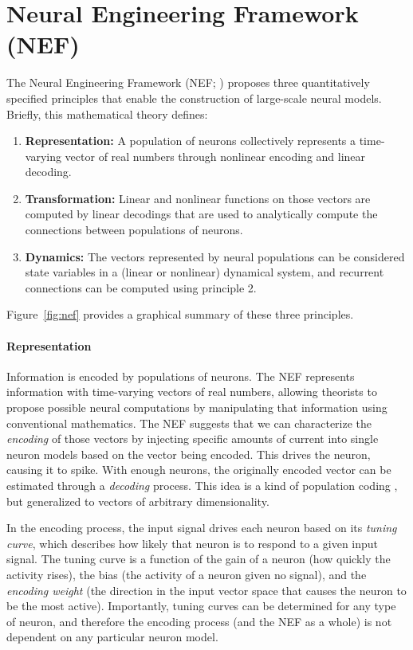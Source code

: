 \documentclass{frontiersSCNS}
\begin{document}
\section{Neural Engineering Framework (NEF)} \label{sec:nef}

The Neural Engineering Framework (NEF; \citealp{eliasmith2003})
proposes three quantitatively specified principles
that enable the construction
of large-scale neural models.
Briefly, this mathematical theory defines:
\begin{enumerate}
  \item \textbf{Representation:} A population of neurons
    collectively represents a time-varying vector of real numbers
    through nonlinear encoding and linear decoding.
  \item \textbf{Transformation:} Linear and nonlinear
    functions on those vectors
    are computed by linear decodings
    that are used to analytically compute
    the connections between populations of neurons.
  \item \textbf{Dynamics:} The vectors represented
    by neural populations can be considered state variables
    in a (linear or nonlinear) dynamical system,
    and recurrent connections can be computed
    using principle 2.
\end{enumerate}
Figure~\ref{fig:nef} provides a graphical
summary of these three principles.

\paragraph{Representation}
Information is encoded by populations of neurons.
The NEF represents information
with time-varying vectors of real numbers,
allowing theorists to propose possible
neural computations by
manipulating that information
using conventional mathematics.
The NEF suggests that we can characterize
the \textit{encoding} of
those vectors by injecting
specific amounts of current into
single neuron models based on
the vector being encoded.
This drives the neuron,
causing it to spike.
With enough neurons,
the originally encoded vector
can be estimated
through a \textit{decoding} process.
This idea is a kind of population coding
\citep{georgopoulos1986, salinas1994}, but generalized
to vectors of arbitrary dimensionality.

In the encoding process, the input signal drives
each neuron based on its \textit{tuning curve},
which describes how likely
that neuron is to respond to a given input signal.
The tuning curve is a function of the gain
of a neuron (how quickly the activity rises),
the bias (the activity of a neuron given no signal),
and the \textit{encoding weight}
(the direction in the input vector space
that causes the neuron to be the most active).
Importantly, tuning curves can be determined
for any type of neuron,
and therefore the encoding process
(and the NEF as a whole)
is not dependent on any particular neuron model.
\end{document}
